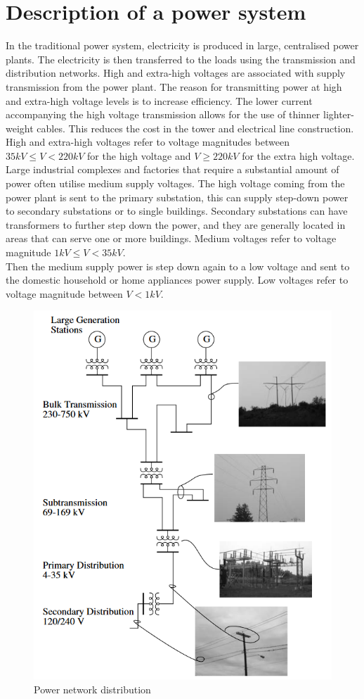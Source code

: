 \section{Description of a power system}
In the traditional power system, electricity is produced in large, centralised power plants. The electricity is then transferred to the loads using the transmission and distribution networks. High and extra-high voltages are associated with supply transmission from the power plant. The reason for transmitting power at high and extra-high voltage levels is to increase efficiency. The lower current accompanying the high voltage transmission allows for the use of thinner lighter-weight cables. This reduces the cost in the tower and electrical line construction. High and extra-high voltages refer to voltage magnitudes between $35 kV \leq V < 220 kV$ for the high voltage and $V \geq 220 kV$ for the extra high voltage. \\
Large industrial complexes and factories that require a substantial amount of power often utilise medium supply voltages. The high voltage coming from the power plant is sent to the primary substation, this can supply step-down power to secondary substations or to single buildings. Secondary substations can have transformers to further step down the power, and they are generally located in areas that can serve one or more buildings. Medium voltages refer to voltage magnitude $1 kV \leq V < 35 kV$. \\
Then the medium supply power is step down again to a low voltage and sent to the domestic household or home appliances power supply. Low voltages refer to voltage magnitude between $V < 1 kV$. \\
\begin{figure}[h]
\centering
    \includegraphics[width=.5\linewidth]{images/DN/DN.PNG}
\caption[Power network distribution]{Power network distribution \cite{EPD}\\}
\end{figure}


